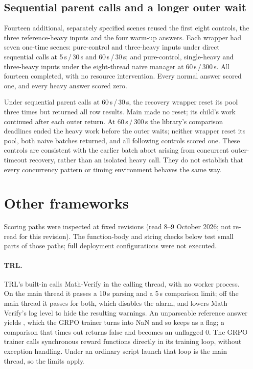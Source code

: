 \documentclass[11pt,a4paper]{article}
\begin{document}
\subsection{Sequential parent calls and a longer outer wait}
Fourteen additional, separately specified scenes reused the first eight controls, the three reference-heavy inputs and the four warm-up answers. Each wrapper had seven one-time scenes: pure-control and three-heavy inputs under direct sequential calls at 5\,s\,/\,30\,s and 60\,s\,/\,30\,s; and pure-control, single-heavy and three-heavy inputs under the eight-thread naive manager at 60\,s\,/\,300\,s. All fourteen completed, with no resource intervention. Every normal answer scored one, and every heavy answer scored zero.

Under sequential parent calls at 60\,s\,/\,30\,s, the recovery wrapper reset its pool three times but returned all row results. Main made no reset; its child's work continued after each outer return. At 60\,s\,/\,300\,s the library's comparison deadlines ended the heavy work before the outer waits; neither wrapper reset its pool, both naive batches returned, and all following controls scored one. These controls are consistent with the earlier batch abort arising from concurrent outer-timeout recovery, rather than an isolated heavy call. They do not establish that every concurrency pattern or timing environment behaves the same way.

\section{Other frameworks}\label{sec:frameworks}
Scoring paths were inspected at fixed revisions (read 8--9 October 2026; not re-read for this revision). The function-body and string checks below test small parts of those paths; full deployment configurations were not executed.

\paragraph{TRL.} TRL's built-in  \cite{trl} calls Math-Verify in the calling thread, with no worker process. On the main thread it passes a 10\,s parsing and a 5\,s comparison limit; off the main thread it passes  for both, which disables the alarm, and lowers Math-Verify's log level to hide the resulting warnings. An unparseable reference answer yields , which the GRPO trainer turns into NaN and so keeps as a flag; a comparison that times out returns false and becomes an unflagged 0. The GRPO trainer calls synchronous reward functions directly in its training loop, without exception handling. Under an ordinary script launch that loop is the main thread, so the limits apply.
\end{document}
